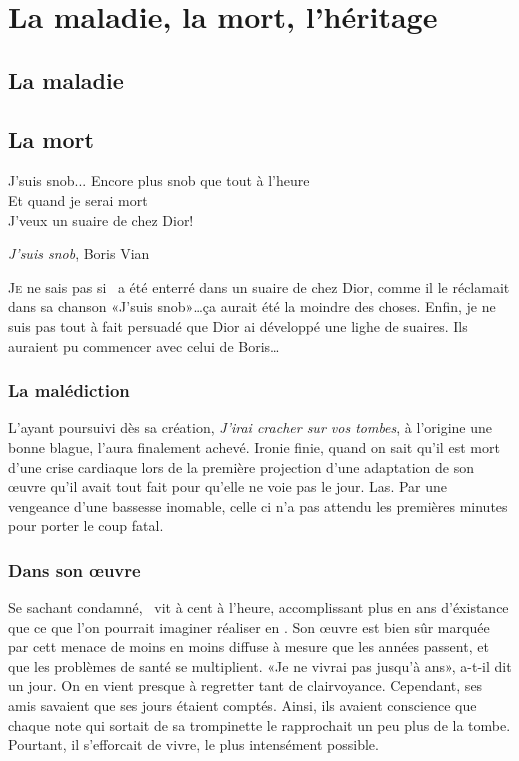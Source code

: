 \chapter{La maladie, la mort, l'héritage}

\section{La maladie}

\section{La mort}
\epigraph{%
J'suis snob... Encore plus snob que tout à l'heure\\%
Et quand je serai mort\\%
J'veux un suaire de chez Dior!%
}{\emph{J'suis snob}, Boris Vian}

\lettrine{J}e ne sais pas si \BV\ a été enterré dans un suaire de chez Dior,
comme il le réclamait dans sa chanson «J'suis snob»\ldots ça aurait été la
moindre des choses. Enfin, je ne suis pas tout à fait persuadé que Dior
ai développé une lighe de suaires. Ils auraient pu commencer avec celui
de Boris\ldots

\subsection{La malédiction}
L'ayant poursuivi dès sa création, \emph{J'irai cracher sur vos tombes}, à
l'origine une bonne blague, l'aura finalement achevé. Ironie finie, quand
on sait qu'il est mort d'une crise cardiaque lors de la première
projection d'une adaptation de son \oe{}uvre qu'il avait tout fait pour
qu'elle ne voie pas le jour. Las. Par une vengeance d'une bassesse inomable,
celle ci n'a pas attendu les premières minutes pour porter le coup fatal.

\subsection{Dans son \oe{}uvre}
Se sachant condamné, \BV\ vit à cent à l'heure, accomplissant plus en  ans
d'éxistance que ce que l'on pourrait imaginer réaliser en . Son \oe{}uvre 
est bien sûr marquée par cett menace de moins en moins diffuse à mesure que 
les années passent, et que les problèmes de santé se multiplient. «Je ne
vivrai pas jusqu'à  ans», a-t-il dit un jour. On en vient presque à
regretter tant de clairvoyance. Cependant, ses amis savaient que ses jours
étaient comptés. Ainsi, ils avaient conscience que chaque note qui sortait
de sa trompinette le rapprochait un peu plus de la tombe. Pourtant, il
s'efforcait de vivre, le plus intensément possible.

